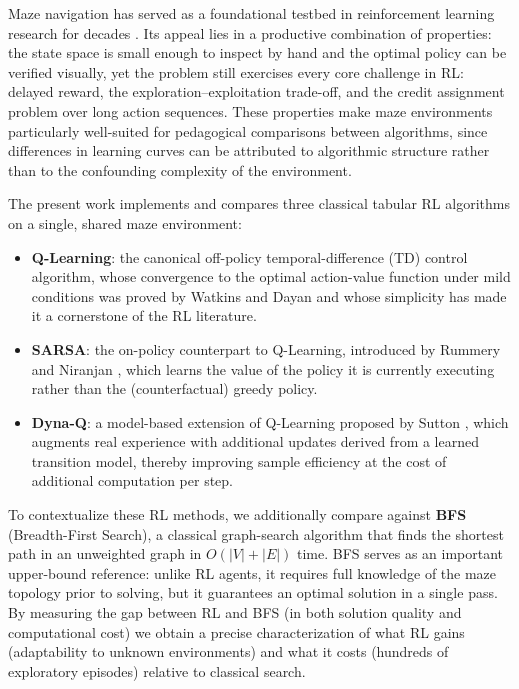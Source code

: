 \documentclass[11pt]{article}
\begin{document}
Maze navigation has served as a foundational testbed in reinforcement
learning research for decades \cite{sutton2018}. Its appeal lies in a
productive combination of properties: the state space is small enough to
inspect by hand and the optimal policy can be verified visually, yet the
problem still exercises every core challenge in RL: delayed reward,
the exploration--exploitation trade-off, and the credit assignment problem
over long action sequences. These properties make maze environments
particularly well-suited for pedagogical comparisons between algorithms,
since differences in learning curves can be attributed to algorithmic
structure rather than to the confounding complexity of the environment.

The present work implements and compares three classical tabular RL
algorithms on a single, shared maze environment:
\begin{itemize}
    \item \textbf{Q-Learning}: the canonical off-policy
    temporal-difference (TD) control algorithm, whose convergence to the
    optimal action-value function under mild conditions was proved by
    Watkins and Dayan \cite{watkins1992} and whose simplicity has made it
    a cornerstone of the RL literature.
    \item \textbf{SARSA}: the on-policy counterpart to Q-Learning,
    introduced by Rummery and Niranjan \cite{rummery1994}, which learns
    the value of the policy it is currently executing rather than the
    (counterfactual) greedy policy.
    \item \textbf{Dyna-Q}: a model-based extension of Q-Learning
    proposed by Sutton \cite{sutton1991dyna}, which augments real
    experience with additional updates derived from a learned transition
    model, thereby improving sample efficiency at the cost of
    additional computation per step.
\end{itemize}

To contextualize these RL methods, we additionally compare against
\textbf{BFS} (Breadth-First Search), a classical graph-search algorithm
that finds the shortest path in an unweighted graph in $O(|V|+|E|)$ time.
BFS serves as an important upper-bound reference: unlike RL agents, it
requires full knowledge of the maze topology prior to solving, but it
guarantees an optimal solution in a single pass. By measuring the gap
between RL and BFS (in both solution quality and computational cost) we
obtain a precise characterization of what RL gains (adaptability to
unknown environments) and what it costs (hundreds of exploratory episodes)
relative to classical search.
\end{document}
